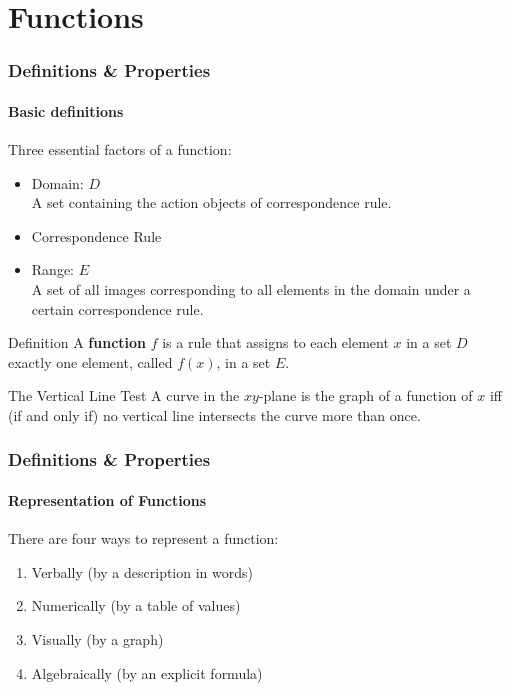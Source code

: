 \documentclass{beamer}
\begin{document}
\section{Functions}

\begin{frame}
    \frametitle{Definitions \& Properties}
    \framesubtitle{Basic definitions}
Three essential factors of a function:
        \begin{itemize}
            \item Domain: $D$\\A set containing the action objects of correspondence rule.
\item Correspondence Rule
            \item Range: $E$\\ A set of all images corresponding to all elements in the domain under a certain correspondence rule.
        \end{itemize}
   \begin{block}{Definition}
        A \textbf{function} $f$ is a rule that assigns to \alert{each element} $x$ in a set $D$ exactly one element, called $f(x)$, in a set $E$.
    \end{block}
\begin{block}{The Vertical Line Test}
        A curve in the $xy$-plane is the graph of a function of $x$ \alert{iff} (if and only if) no vertical line intersects the curve more than once.
    \end{block}
\end{frame}

\begin{frame}
\frametitle{Definitions \& Properties}
    \framesubtitle{Representation of Functions}
There are four ways to represent a function:
        \begin{enumerate}
            \item Verbally (by a description in words)
            \item Numerically (by a table of values)
            \item Visually (by a graph)
            \item Algebraically (by an explicit formula)
        \end{enumerate}
\end{frame}
\end{document}
